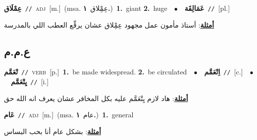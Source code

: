 \documentclass[10pt,a4paper,twoside]{article} %
\begin{document}
\begin{multicols}{2}
{\setlength\topsep{0pt}\textbf{\foreignlanguage{arabic}{عِمْلَاق}}\ {\color{gray}\texttt{//}\color{black}}\ \textsc{adj}\ [m.]\ \color{gray}(msa. \foreignlanguage{arabic}{عِمِْلاق}~\foreignlanguage{arabic}{\textbf{١.}})\color{black}\ \textbf{1.}~giant  \textbf{2.}~huge\ \ $\bullet$\ \ \setlength\topsep{0pt}\textbf{\foreignlanguage{arabic}{عَمَالِقَة}}\ {\color{gray}\texttt{//}\color{black}}\ [pl.]\  \begin{flushright}\color{gray}\foreignlanguage{arabic}{\textbf{\underline{\foreignlanguage{arabic}{أمثلة}}}: أستاذ مأمون عمل مجهود عِمِْلاق عشان يرقِّع العطب اللي بالمدرسة}\end{flushright}\color{black}} \vspace{2mm}

\vspace{-3mm}
\subsection*{\color{blue}\foreignlanguage{arabic}{ع.م.م}\color{blue}{}} 

{\setlength\topsep{0pt}\textbf{\foreignlanguage{arabic}{تْعَمَّم}}\ {\color{gray}\texttt{//}\color{black}}\ \textsc{verb}\ [p.]\ \textbf{1.}~be made widespread.  \textbf{2.}~be circulated\ \ $\bullet$\ \ \setlength\topsep{0pt}\textbf{\foreignlanguage{arabic}{اِتْعَمَّم}}\ {\color{gray}\texttt{//}\color{black}}\ [c.]\ \ $\bullet$\ \ \setlength\topsep{0pt}\textbf{\foreignlanguage{arabic}{يِتْعَمَّم}}\ {\color{gray}\texttt{//}\color{black}}\ [i.]\  \begin{flushright}\color{gray}\foreignlanguage{arabic}{\textbf{\underline{\foreignlanguage{arabic}{أمثلة}}}: هاد لازم يِتْعَمَّم عليه بكل المخافر عشان يعرف انه الله حق}\end{flushright}\color{black}} \vspace{2mm}

{\setlength\topsep{0pt}\textbf{\foreignlanguage{arabic}{عَام}}\ {\color{gray}\texttt{//}\color{black}}\ \textsc{adj}\ [m.]\ \color{gray}(msa. \foreignlanguage{arabic}{عام}~\foreignlanguage{arabic}{\textbf{١.}})\color{black}\ \textbf{1.}~general\  \begin{flushright}\color{gray}\foreignlanguage{arabic}{\textbf{\underline{\foreignlanguage{arabic}{أمثلة}}}: بشكل عام أنا بحب البساس}\end{flushright}\color{black}} \vspace{2mm}


\end{multicols}
\end{document}
